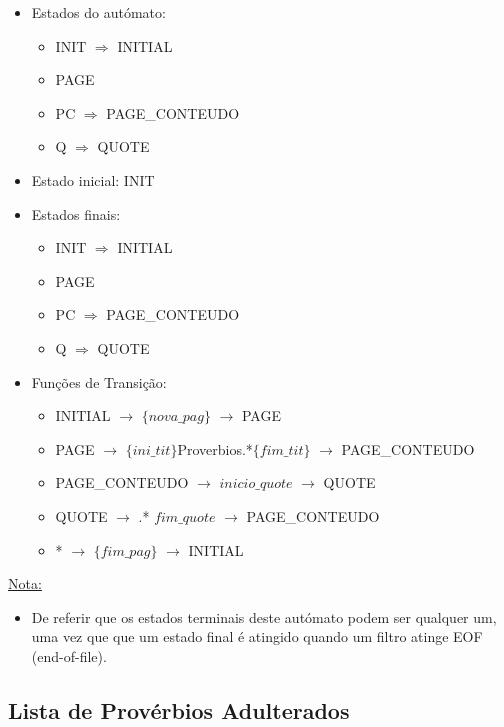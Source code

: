 \documentclass[11pt,a4paper]{report}
\begin{document}
\begin{itemize}
	\item Estados do autómato:
		\begin{itemize}
			\item INIT $\Rightarrow$ INITIAL
			\item PAGE
			\item PC $\Rightarrow$ PAGE\_CONTEUDO
			\item Q $\Rightarrow$ QUOTE
		\end{itemize}
	\item Estado inicial: INIT
	\item Estados finais:
		\begin{itemize}
			\item INIT $\Rightarrow$ INITIAL
			\item PAGE
			\item PC $\Rightarrow$ PAGE\_CONTEUDO
			\item Q $\Rightarrow$ QUOTE
		\end{itemize}
	\item Funções de Transição:
		\begin{itemize}
			\item INITIAL $\rightarrow$ $\{nova\_pag\}$ $\rightarrow$ PAGE
			\item PAGE $\rightarrow$ $\{ini\_tit\}$Proverbios.*$\{fim\_tit\}$ $\rightarrow$ PAGE\_CONTEUDO
			\item PAGE\_CONTEUDO $\rightarrow$ $inicio\_quote$ $\rightarrow$ QUOTE
			\item QUOTE $\rightarrow$ .* $fim\_quote$ $\rightarrow$ PAGE\_CONTEUDO
			\item * $\rightarrow$ $\{fim\_pag\}$ $\rightarrow$ INITIAL
		\end{itemize}
\end{itemize}

\vspace{0.5cm}

\underline{Nota:}
\begin{itemize}
	\item De referir que os estados terminais deste autómato podem ser qualquer um, uma vez que que um estado final é atingido quando um filtro atinge EOF (end-of-file).
\end{itemize}



\newpage

\subsection{Lista de Provérbios Adulterados}
\label{sub:algoritmos3}
\end{document}
